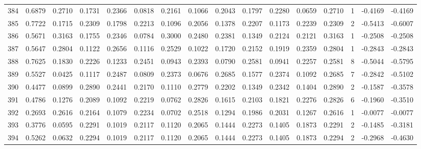 \begin{tabular}{lrrrrrrrrrrrrrrr}
384 &      0.6879 &  0.2710 &  0.1731 &  0.2366 &  0.0818 &  0.2161 &  0.1066 &  0.2043 &  0.1797 &  0.2280 &   0.0659 &     0.2710 &      1 &                   -0.4169 &                    -0.4169 \\
385 &      0.7722 &  0.1715 &  0.2309 &  0.1798 &  0.2213 &  0.1096 &  0.2056 &  0.1378 &  0.2207 &  0.1173 &   0.2239 &     0.2309 &      2 &                   -0.5413 &                    -0.6007 \\
386 &      0.5671 &  0.3163 &  0.1755 &  0.2346 &  0.0784 &  0.3000 &  0.2480 &  0.2381 &  0.1349 &  0.2124 &   0.2121 &     0.3163 &      1 &                   -0.2508 &                    -0.2508 \\
387 &      0.5647 &  0.2804 &  0.1122 &  0.2656 &  0.1116 &  0.2529 &  0.1022 &  0.1720 &  0.2152 &  0.1919 &   0.2359 &     0.2804 &      1 &                   -0.2843 &                    -0.2843 \\
388 &      0.7625 &  0.1830 &  0.2226 &  0.1233 &  0.2451 &  0.0943 &  0.2393 &  0.0790 &  0.2581 &  0.0941 &   0.2257 &     0.2581 &      8 &                   -0.5044 &                    -0.5795 \\
389 &      0.5527 &  0.0425 &  0.1117 &  0.2487 &  0.0809 &  0.2373 &  0.0676 &  0.2685 &  0.1577 &  0.2374 &   0.1092 &     0.2685 &      7 &                   -0.2842 &                    -0.5102 \\
390 &      0.4477 &  0.0899 &  0.2890 &  0.2441 &  0.2170 &  0.1110 &  0.2779 &  0.2202 &  0.1349 &  0.2342 &   0.1404 &     0.2890 &      2 &                   -0.1587 &                    -0.3578 \\
391 &      0.4786 &  0.1276 &  0.2089 &  0.1092 &  0.2219 &  0.0762 &  0.2826 &  0.1615 &  0.2103 &  0.1821 &   0.2276 &     0.2826 &      6 &                   -0.1960 &                    -0.3510 \\
392 &      0.2693 &  0.2616 &  0.2164 &  0.1079 &  0.2234 &  0.0702 &  0.2518 &  0.1294 &  0.1986 &  0.2031 &   0.1267 &     0.2616 &      1 &                   -0.0077 &                    -0.0077 \\
393 &      0.3776 &  0.0595 &  0.2291 &  0.1019 &  0.2117 &  0.1120 &  0.2065 &  0.1444 &  0.2273 &  0.1405 &   0.1873 &     0.2291 &      2 &                   -0.1485 &                    -0.3181 \\
394 &      0.5262 &  0.0632 &  0.2294 &  0.1019 &  0.2117 &  0.1120 &  0.2065 &  0.1444 &  0.2273 &  0.1405 &   0.1873 &     0.2294 &      2 &                   -0.2968 &                    -0.4630 \\

\end{tabular}
